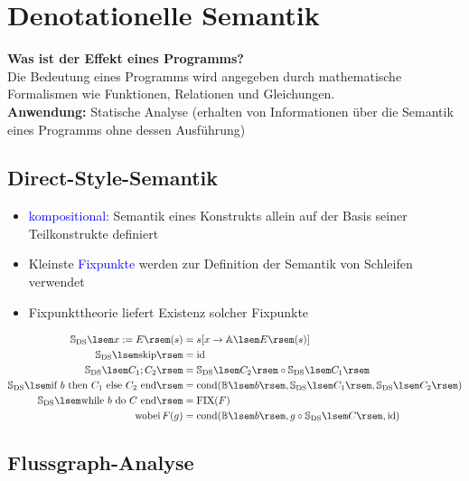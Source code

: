 \documentclass{scrreprt}
\theoremstyle{definition}
\theoremstyle{example}
\theoremstyle{algorithm}
\begin{document}
\section{Denotationelle Semantik}
\textbf{\textsf{Was ist der Effekt eines Programms?}}\\
Die Bedeutung eines Programms wird angegeben durch mathematische Formalismen wie Funktionen, Relationen und Gleichungen.\\
\textbf{Anwendung:} Statische Analyse (erhalten von Informationen über die Semantik eines Programms ohne dessen Ausführung)

\subsection{Direct-Style-Semantik}
\begin{itemize}
\item
\textcolor{blue}{kompositional}: Semantik eines Konstrukts allein auf der Basis seiner Teilkonstrukte definiert
\item
Kleinste \textcolor{blue}{Fixpunkte} werden zur Definition der Semantik von Schleifen verwendet
\item
Fixpunkttheorie liefert Existenz solcher Fixpunkte
\end{itemize}

\begin{framed}
\begin{align*}
\mathbb{S}_\text{DS}\lsem x:=E \rsem (s)&= s[x\rightarrow\mathbb{A}\lsem E\rsem(s)]\\
\mathbb{S}_\text{DS}\lsem \text{skip} \rsem&= \text{id}\\
\mathbb{S}_\text{DS}\lsem C_1;C_2 \rsem&= \mathbb{S}_\text{DS}\lsem C_2 \rsem \circ \mathbb{S}_\text{DS}\lsem C_1 \rsem\\
\mathbb{S}_\text{DS}\lsem \text{if $b$ then $C_1$ else $C_2$ end} \rsem&= \text{cond}(\mathbb{B}\lsem b\rsem,\mathbb{S}_\text{DS}\lsem C_1 \rsem,\mathbb{S}_\text{DS}\lsem C_2 \rsem)\\
\mathbb{S}_\text{DS}\lsem \text{while $b$ do $C$ end} \rsem&= \text{FIX}(F)\\
\text{wobei}\,F(g)&=\text{cond}(\mathbb{B}\lsem b\rsem,g \circ \mathbb{S}_\text{DS}\lsem C \rsem,\text{id})
\end{align*}
\end{framed}

\subsection{Flussgraph-Analyse}
\end{document}
